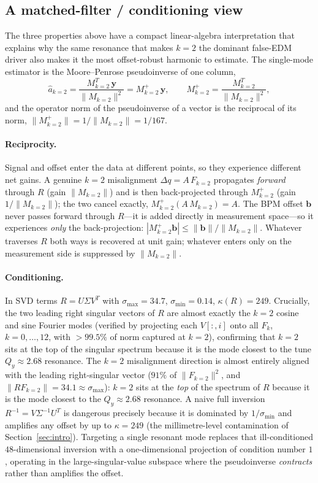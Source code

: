 \documentclass[preprint,12pt]{elsarticle}
\begin{document}
\subsection{A matched-filter / conditioning view}
\label{sec:matchedfilter}

The three properties above have a compact linear-algebra interpretation that
explains why the same resonance that makes $k=2$ the dominant false-EDM driver
also makes it the most offset-robust harmonic to estimate. The single-mode
estimator is the Moore--Penrose pseudoinverse of one column,
\begin{equation}
\hat a_{k=2} = \frac{M_{k=2}^T\,\mathbf{y}}{\|M_{k=2}\|^2}
             = M_{k=2}^{+}\,\mathbf{y},
\qquad
M_{k=2}^{+} = \frac{M_{k=2}^T}{\|M_{k=2}\|^2},
\end{equation}
and the operator norm of the pseudoinverse of a vector is the reciprocal of
its norm, $\|M_{k=2}^{+}\|=1/\|M_{k=2}\|=1/167$.

\paragraph{Reciprocity.} Signal and offset enter the data at different points,
so they experience different net gains. A genuine $k=2$ misalignment
$\Delta q=A\,F_{k=2}$ propagates \emph{forward} through $R$ (gain
$\|M_{k=2}\|$) and is then back-projected through $M_{k=2}^{+}$ (gain
$1/\|M_{k=2}\|$); the two cancel exactly, $M_{k=2}^{+}(A\,M_{k=2})=A$. The BPM
offset $\mathbf{b}$ never passes forward through $R$---it is added directly in
measurement space---so it experiences \emph{only} the back-projection:
$|M_{k=2}^{+}\mathbf{b}|\le\|\mathbf{b}\|/\|M_{k=2}\|$. Whatever traverses $R$
both ways is recovered at unit gain; whatever enters only on the measurement
side is suppressed by $\|M_{k=2}\|$.

\paragraph{Conditioning.} In SVD terms $R=U\Sigma V^T$ with
$\sigma_{\max}=34.7$, $\sigma_{\min}=0.14$, $\kappa(R)=249$. Crucially, the
two leading right singular vectors of $R$ are almost exactly the $k=2$ cosine
and sine Fourier modes (verified by projecting each $V[:,i]$ onto all $F_k$,
$k=0,\ldots,12$, with $>99.5\%$ of norm captured at $k=2$), confirming that
$k=2$ sits at the top of the singular spectrum because it is the mode closest
to the tune $Q_y\approx2.68$ resonance. The $k=2$
misalignment direction is almost entirely aligned with the leading
right-singular vector ($91\%$ of $\|F_{k=2}\|^2$, and $\|RF_{k=2}\|=34.1\approx
\sigma_{\max}$): $k=2$ sits at the \emph{top} of the spectrum of $R$ because it
is the mode closest to the $Q_y\approx2.68$ resonance. A naive full inversion
$R^{-1}=V\Sigma^{-1}U^T$ is dangerous precisely because it is dominated by
$1/\sigma_{\min}$ and amplifies any offset by up to $\kappa=249$ (the
millimetre-level contamination of Section~\ref{sec:intro}). Targeting a single
resonant mode replaces that ill-conditioned $48$-dimensional inversion with a
one-dimensional projection of condition number $1$, operating in the
large-singular-value subspace where the pseudoinverse \emph{contracts} rather
than amplifies the offset.
\end{document}
